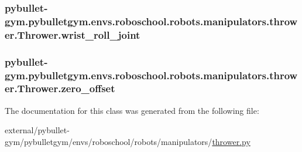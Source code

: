 \subsubsection[{\texorpdfstring{wrist\+\_\+roll\+\_\+joint}{wrist_roll_joint}}]{\setlength{\rightskip}{0pt plus 5cm}pybullet-\/gym.\+pybulletgym.\+envs.\+roboschool.\+robots.\+manipulators.\+thrower.\+Thrower.\+wrist\+\_\+roll\+\_\+joint}\hypertarget{classpybullet-gym_1_1pybulletgym_1_1envs_1_1roboschool_1_1robots_1_1manipulators_1_1thrower_1_1_thrower_a1c96d5f8902d51301bd13a117ae67095}{}\label{classpybullet-gym_1_1pybulletgym_1_1envs_1_1roboschool_1_1robots_1_1manipulators_1_1thrower_1_1_thrower_a1c96d5f8902d51301bd13a117ae67095}
\subsubsection[{\texorpdfstring{zero\+\_\+offset}{zero_offset}}]{\setlength{\rightskip}{0pt plus 5cm}pybullet-\/gym.\+pybulletgym.\+envs.\+roboschool.\+robots.\+manipulators.\+thrower.\+Thrower.\+zero\+\_\+offset}\hypertarget{classpybullet-gym_1_1pybulletgym_1_1envs_1_1roboschool_1_1robots_1_1manipulators_1_1thrower_1_1_thrower_aeaf11f0355ef2b34c02f8bc70b71994e}{}\label{classpybullet-gym_1_1pybulletgym_1_1envs_1_1roboschool_1_1robots_1_1manipulators_1_1thrower_1_1_thrower_aeaf11f0355ef2b34c02f8bc70b71994e}


The documentation for this class was generated from the following file\+:\begin{DoxyCompactItemize}
\item 
external/pybullet-\/gym/pybulletgym/envs/roboschool/robots/manipulators/\hyperlink{roboschool_2robots_2manipulators_2thrower_8py}{thrower.\+py}\end{DoxyCompactItemize}
